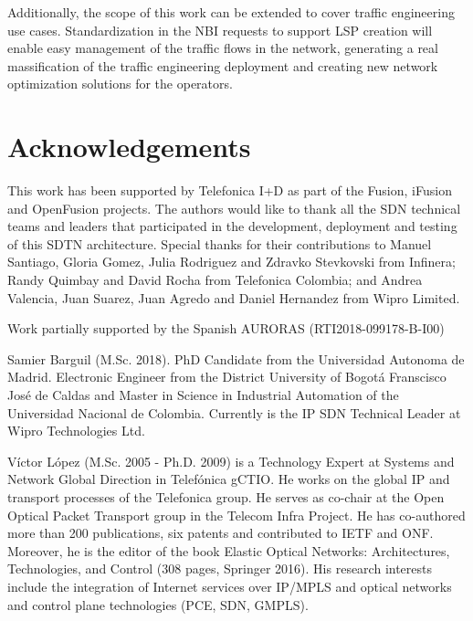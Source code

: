 \documentclass[a4paper,fleqn]{cas-dc}
\begin{document}
Additionally, the scope of this work can be extended to cover traffic engineering use cases. Standardization in the NBI requests to support LSP creation will enable easy management of the traffic flows in the network, generating a real massification of the traffic engineering deployment and creating new network optimization solutions for the operators.

\printcredits

\section*{Acknowledgements}
This work has been supported by Telefonica I+D as part of the Fusion, iFusion and OpenFusion projects. The authors would like to thank all the SDN technical teams and leaders that participated in the development, deployment and testing of this SDTN architecture. Special thanks for their contributions to Manuel Santiago, Gloria Gomez, Julia Rodriguez and Zdravko Stevkovski from Infinera; Randy Quimbay and David Rocha from Telefonica Colombia; and Andrea Valencia, Juan Suarez, Juan Agredo and Daniel Hernandez from Wipro Limited.   

Work partially supported by the Spanish AURORAS (RTI2018-099178-B-I00)

%
%






Samier Barguil (M.Sc. 2018). PhD Candidate from the Universidad Autonoma de Madrid. Electronic Engineer from the District University of Bogot\'a Franscisco Jos\'e de Caldas and Master in Science in Industrial Automation of the Universidad Nacional de Colombia. Currently is the IP SDN Technical Leader at Wipro Technologies Ltd. 
\endbio

Víctor López (M.Sc. 2005 - Ph.D. 2009) is a Technology Expert at Systems and Network Global Direction in Telefónica gCTIO. He works on the global IP and transport processes of the Telefonica group. He serves as co-chair at the Open Optical Packet Transport group in the Telecom Infra Project. He has co-authored more than 200 publications, six patents and contributed to IETF and ONF. Moreover, he is the editor of the book Elastic Optical Networks: Architectures, Technologies, and Control (308 pages, Springer 2016). His research interests include the integration of Internet services over IP/MPLS and optical networks and control plane technologies (PCE, SDN, GMPLS).
\endbio
\end{document}
